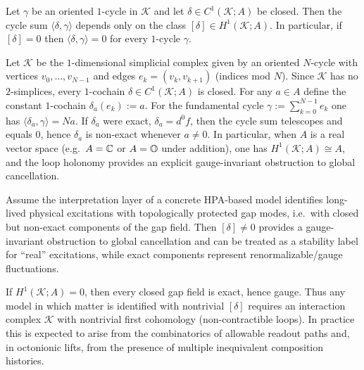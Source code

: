 \begin{proposition}
\label{prop:gap_holonomy_class}
Let $\gamma$ be an oriented $1$-cycle in $\mathcal{K}$ and let $\delta\in C^1(\mathcal{K};A)$ be closed.
Then the cycle sum $\langle \delta,\gamma\rangle$ depends only on the class $[\delta]\in H^1(\mathcal{K};A)$.
In particular, if $[\delta]=0$ then $\langle \delta,\gamma\rangle=0$ for every $1$-cycle $\gamma$.
\end{proposition}

\begin{remark}
\label{rem:gap_h1_toy_cycle}
Let $\mathcal{K}$ be the $1$-dimensional simplicial complex given by an oriented $N$-cycle with vertices $v_0,\dots,v_{N-1}$ and edges $e_k=(v_k,v_{k+1})$ (indices mod $N$).
Since $\mathcal{K}$ has no $2$-simplices, every $1$-cochain $\delta\in C^1(\mathcal{K};A)$ is closed.
For any $a\in A$ define the constant $1$-cochain $\delta_a(e_k):=a$.
For the fundamental cycle $\gamma:=\sum_{k=0}^{N-1}e_k$ one has $\langle \delta_a,\gamma\rangle=Na$.
If $\delta_a$ were exact, $\delta_a=d^0 f$, then the cycle sum telescopes and equals $0$, hence $\delta_a$ is non-exact whenever $a\ne 0$.
In particular, when $A$ is a real vector space (e.g.\ $A=\mathbb{C}$ or $A=\mathbb{O}$ under addition), one has $H^1(\mathcal{K};A)\cong A$, and the loop holonomy provides an explicit gauge-invariant obstruction to global cancellation.
\end{remark}

\begin{assumption}
\label{assump:matter_gap_cohomology}
Assume the interpretation layer of a concrete HPA-based model identifies long-lived physical excitations with topologically protected gap modes, i.e.\ with closed but non-exact components of the gap field.
Then $[\delta]\neq 0$ provides a gauge-invariant obstruction to global cancellation and can be treated as a stability label for ``real'' excitations, while exact components represent renormalizable/gauge fluctuations.
\end{assumption}

\begin{remark}
If $H^1(\mathcal{K};A)=0$, then every closed gap field is exact, hence gauge.
Thus any model in which matter is identified with nontrivial $[\delta]$ requires an interaction complex $\mathcal{K}$ with nontrivial first cohomology (non-contractible loops).
In practice this is expected to arise from the combinatorics of allowable readout paths and, in octonionic lifts, from the presence of multiple inequivalent composition histories.
\end{remark}

